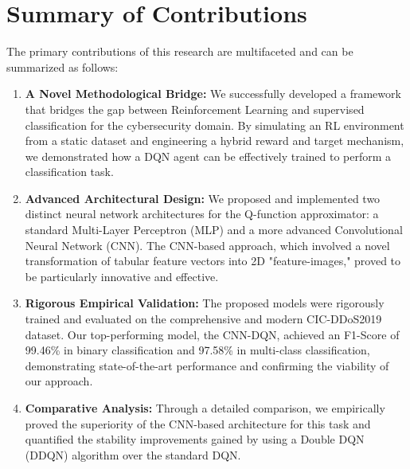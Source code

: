 \documentclass[16pt]{report}
\begin{document}
\section*{Summary of Contributions}
The primary contributions of this research are multifaceted and can be summarized as follows:
\begin{enumerate}
    \item \textbf{A Novel Methodological Bridge:} We successfully developed a framework that bridges the gap between Reinforcement Learning and supervised classification for the cybersecurity domain. By simulating an RL environment from a static dataset and engineering a hybrid reward and target mechanism, we demonstrated how a DQN agent can be effectively trained to perform a classification task.
    \item \textbf{Advanced Architectural Design:} We proposed and implemented two distinct neural network architectures for the Q-function approximator: a standard Multi-Layer Perceptron (MLP) and a more advanced Convolutional Neural Network (CNN). The CNN-based approach, which involved a novel transformation of tabular feature vectors into 2D "feature-images," proved to be particularly innovative and effective.
    \item \textbf{Rigorous Empirical Validation:} The proposed models were rigorously trained and evaluated on the comprehensive and modern CIC-DDoS2019 dataset. Our top-performing model, the CNN-DQN, achieved an F1-Score of 99.46\% in binary classification and 97.58\% in multi-class classification, demonstrating state-of-the-art performance and confirming the viability of our approach.
    \item \textbf{Comparative Analysis:} Through a detailed comparison, we empirically proved the superiority of the CNN-based architecture for this task and quantified the stability improvements gained by using a Double DQN (DDQN) algorithm over the standard DQN.
\end{enumerate}
\end{document}

